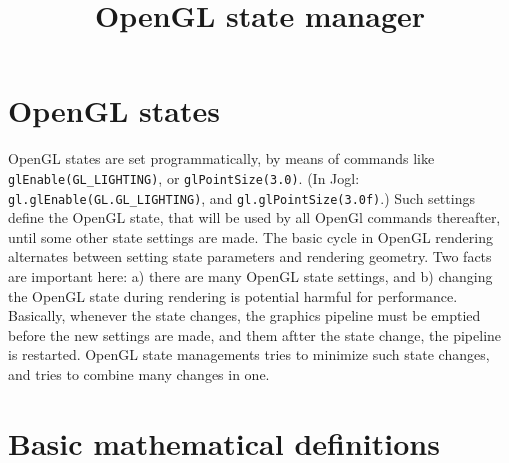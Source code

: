 \documentclass[10pt, fleqn]{report}
\title{OpenGL state manager}
\date{}
\begin{document}
\maketitle

\section{OpenGL states}
OpenGL states are set programmatically, by means of commands like \verb#glEnable(GL_LIGHTING)#,
or \verb#glPointSize(3.0)#.
(In Jogl: \verb#gl.glEnable(GL.GL_LIGHTING)#, and \verb#gl.glPointSize(3.0f)#.)
Such settings define the OpenGL state, that will be used by all OpenGl commands thereafter, until
some other state settings are made.
The basic cycle in OpenGL rendering alternates between setting state parameters and rendering geometry.
Two facts are important here: a) there are many OpenGL state settings, and b) changing the
OpenGL state during rendering is potential harmful for performance. Basically, whenever the
state changes, the graphics pipeline must be emptied before the new settings are made, and them aftter the state change, the pipeline is restarted. OpenGL state managements tries to minimize such state changes, and tries to combine many changes in one.

\section{Basic mathematical definitions}
\end{document}

